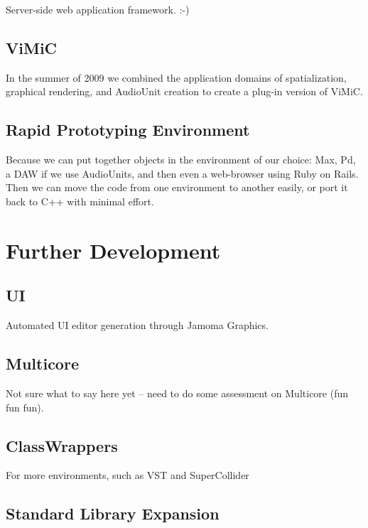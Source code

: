 \documentclass[twoside,10pt]{article}
\begin{document}
Server-side web application framework.  :-)

\subsection{ViMiC}
In the summer of 2009 we combined the application domains of spatialization, graphical rendering, and AudioUnit creation to create a plug-in version of ViMiC\cite{Peters:2008b}.


\subsection{Rapid Prototyping Environment}

Because we can put together objects in the environment of our choice: Max, Pd, a DAW if we use AudioUnits, and then even a web-browser using Ruby on Rails.  Then we can move the code from one environment to another easily, or port it back to C++ with minimal effort.



\section{Further Development} %

\subsection{UI}

Automated UI editor generation through Jamoma Graphics.

\subsection{Multicore}

Not sure what to say here yet -- need to do some assessment on Multicore (fun fun fun).

\subsection{ClassWrappers}

For more environments, such as VST and SuperCollider

\subsection{Standard Library Expansion}
\end{document}
